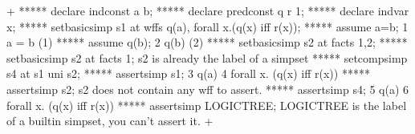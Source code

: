 



\gfexample+
   ***** declare indconst a b;
   ***** declare predconst q r 1;
   ***** declare indvar x;
   ***** setbasicsimp s1 at wffs {q(a), forall x.(q(x) iff r(x))};
   ***** assume a=b;
   1   a = b     (1)
   ***** assume q(b);
   2   q(b)     (2)
   ***** setbasicsimp s2 at facts {1,2};
   ***** setbasicsimp s2 at facts {1};
   s2 is already the label of a simpset
   ***** setcompsimp s4 at s1 uni s2;
   ***** assertsimp s1;
   3   q(a)     
   4   forall x. (q(x) iff r(x))     
   ***** assertsimp s2;
   s2 does not contain any wff to assert.
   ***** assertsimp s4;
   5   q(a)
   6   forall x. (q(x) iff r(x))
   ***** assertsimp LOGICTREE;
   LOGICTREE is the label of a builtin simpset, you can't assert it.
+